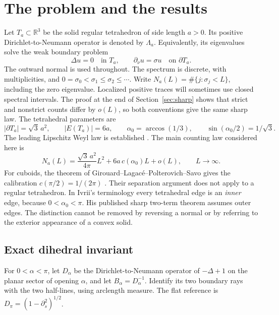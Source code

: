 \documentclass[11pt]{amsart}
\numberwithin{equation}{section}
\theoremstyle{remark}
\newcommand{\R}{\mathbb{R}}
\begin{document}
\section{The problem and the results}

Let $T_a\subset\R^3$ be the solid regular tetrahedron of side length $a>0$. Its positive Dirichlet-to-Neumann operator is denoted by $\Lambda_a$. Equivalently, its eigenvalues solve the weak boundary problem
\begin{equation}\label{eq:steklov}
\Delta u=0 \quad\text{in } T_a,\qquad \partial_\nu u=\sigma u\quad\text{on }\partial T_a .
\end{equation}
The outward normal is used throughout. The spectrum is discrete, with multiplicities, and $0=\sigma_0<\sigma_1\le\sigma_2\le\cdots$. Write $N_a(L)=\#\{j:\sigma_j<L\}$, including the zero eigenvalue. Localized positive traces will sometimes use closed spectral intervals. The proof at the end of Section~\ref{sec:sharp} shows that strict and nonstrict counts differ by $o(L)$, so both conventions give the same sharp law. The tetrahedral parameters are
\begin{equation}\label{eq:params}
|\partial T_a|=\sqrt3\,a^2,\qquad |E(T_a)|=6a,\qquad \alpha_0=\arccos(1/3),\qquad \sin(\alpha_0/2)=1/\sqrt3 .
\end{equation}
The leading Lipschitz Weyl law is established \cite{R}. The main counting law considered here is
\begin{equation}\label{eq:main}
N_a(L)=\frac{\sqrt3\,a^2}{4\pi}L^2+6a\,c(\alpha_0)L+o(L),\qquad L\longrightarrow\infty .
\end{equation}
For cuboids, the theorem of Girouard--Lagac\'e--Polterovich--Savo gives the calibration $c(\pi/2)=1/(2\pi)$ \cite{GLPS}. Their separation argument does not apply to a regular tetrahedron. In Ivrii's terminology every tetrahedral edge is an \emph{inner} edge, because $0<\alpha_0<\pi$. His published sharp two-term theorem assumes outer edges. The distinction cannot be removed by reversing a normal or by referring to the exterior appearance of a convex solid.

\subsection{Exact dihedral invariant}
For $0<\alpha<\pi$, let $D_\alpha$ be the Dirichlet-to-Neumann operator of $-\Delta+1$ on the planar sector of opening $\alpha$, and let $B_\alpha=D_\alpha^{-1}$. Identify its two boundary rays with the two half-lines, using arclength measure. The flat reference is $D_\pi=(1-\partial_s^2)^{1/2}$.
\end{document}
